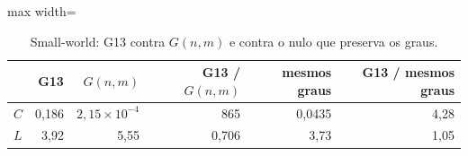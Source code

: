 \begin{table}[t]
\centering
\small
\caption{Small-world: G13 contra $G(n,m)$ e contra o nulo que preserva os graus.}
\label{tab:smallworld}
\begin{adjustbox}{max width=\linewidth}
\begin{tabular}{lrrrrr}
\toprule
 & G13 & $G(n,m)$ & G13 / $G(n,m)$ & mesmos graus & G13 / mesmos graus \\
\midrule
$C$ & 0,186 & $2,15 \times 10^{-4}$ & 865 & 0,0435 & 4,28 \\
$L$ & 3,92 & 5,55 & 0,706 & 3,73 & 1,05 \\
\bottomrule
\end{tabular}
\end{adjustbox}
\end{table}
